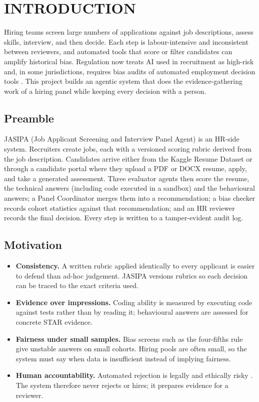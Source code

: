 \chapter{INTRODUCTION}

\justify
Hiring teams screen large numbers of applications against job descriptions, assess skills, interview, and then decide. Each step is labour-intensive and inconsistent between reviewers, and automated tools that score or filter candidates can amplify historical bias. Regulation now treats AI used in recruitment as high-risk \cite{euaiact2024} and, in some jurisdictions, requires bias audits of automated employment decision tools \cite{nyc144}. This project builds an agentic system that does the evidence-gathering work of a hiring panel while keeping every decision with a person.

\section{Preamble}
\justify
JASIPA (Job Applicant Screening and Interview Panel Agent) is an HR-side system. Recruiters create jobs, each with a versioned scoring rubric derived from the job description. Candidates arrive either from the Kaggle Resume Dataset \cite{kaggleresume} or through a candidate portal where they upload a PDF or DOCX resume, apply, and take a generated assessment. Three evaluator agents then score the resume, the technical answers (including code executed in a sandbox) and the behavioural answers; a Panel Coordinator merges them into a recommendation; a bias checker records cohort statistics against that recommendation; and an HR reviewer records the final decision. Every step is written to a tamper-evident audit log.

\section{Motivation}
\justify
\begin{itemize}
\item \textbf{Consistency.} A written rubric applied identically to every applicant is easier to defend than ad-hoc judgement. JASIPA versions rubrics so each decision can be traced to the exact criteria used.
\item \textbf{Evidence over impressions.} Coding ability is measured by executing code against tests rather than by reading it; behavioural answers are assessed for concrete STAR evidence.
\item \textbf{Fairness under small samples.} Bias screens such as the four-fifths rule \cite{eeoc1978} give unstable answers on small cohorts. Hiring pools are often small, so the system must say when data is insufficient instead of implying fairness.
\item \textbf{Human accountability.} Automated rejection is legally and ethically risky \cite{raghavan2020}. The system therefore never rejects or hires; it prepares evidence for a reviewer.
\end{itemize}

